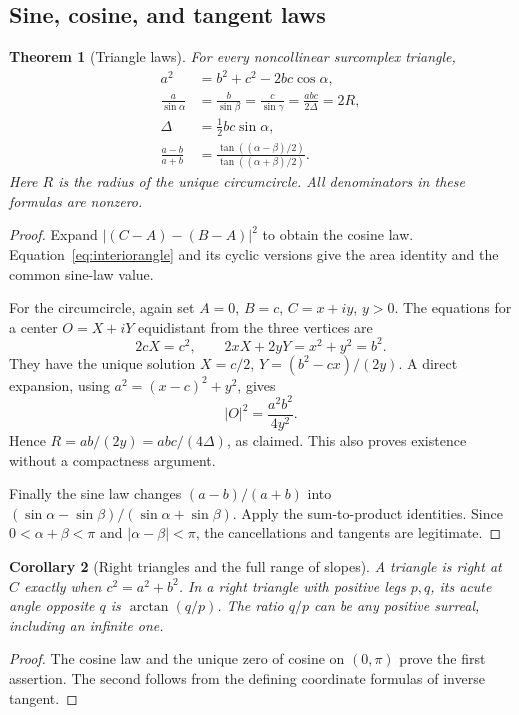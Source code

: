 \documentclass[11pt]{article}
\numberwithin{equation}{section}
\newtheorem{theorem}{Theorem}[section]
\newtheorem{corollary}[theorem]{Corollary}
\theoremstyle{definition}
\begin{document}
\subsection{Sine, cosine, and tangent laws}
\begin{theorem}[Triangle laws]\label{thm:trianglelaws}
For every noncollinear surcomplex triangle,
\begin{align}
 a^2&=b^2+c^2-2bc\cos\alpha,\\
 \frac a{\sin\alpha}&=\frac b{\sin\beta}=\frac c{\sin\gamma}
 =\frac{abc}{2\Delta}=2R,\\
 \Delta&=\tfrac12bc\sin\alpha,\\
 \frac{a-b}{a+b}
 &=\frac{\tan((\alpha-\beta)/2)}{\tan((\alpha+\beta)/2)}.
 \label{eq:trianglelaws}
\end{align}
Here $R$ is the radius of the unique circumcircle. All denominators in these formulas are nonzero.
\end{theorem}
\begin{proof}
Expand $|(C-A)-(B-A)|^2$ to obtain the cosine law. Equation~\eqref{eq:interiorangle} and its cyclic versions give the area identity and the common sine-law value.

For the circumcircle, again set $A=0$, $B=c$, $C=x+iy$, $y>0$. The equations for a center $O=X+iY$ equidistant from the three vertices are
\[
 2cX=c^2,\qquad 2xX+2yY=x^2+y^2=b^2.
\]
They have the unique solution $X=c/2$, $Y=(b^2-cx)/(2y)$. A direct expansion, using $a^2=(x-c)^2+y^2$, gives
\[
 |O|^2=\frac{a^2b^2}{4y^2}.
\]
Hence $R=ab/(2y)=abc/(4\Delta)$, as claimed. This also proves existence without a compactness argument.

Finally the sine law changes $(a-b)/(a+b)$ into
$(\sin\alpha-\sin\beta)/(\sin\alpha+\sin\beta)$. Apply the sum-to-product identities. Since $0<\alpha+\beta<\pi$ and $|\alpha-\beta|<\pi$, the cancellations and tangents are legitimate.
\end{proof}

\begin{corollary}[Right triangles and the full range of slopes]\label{cor:right}
A triangle is right at $C$ exactly when $c^2=a^2+b^2$. In a right triangle with positive legs $p,q$, its acute angle opposite $q$ is $\arctan(q/p)$. The ratio $q/p$ can be any positive surreal, including an infinite one.
\end{corollary}
\begin{proof}
The cosine law and the unique zero of cosine on $(0,\pi)$ prove the first assertion. The second follows from the defining coordinate formulas of inverse tangent.
\end{proof}
\end{document}
